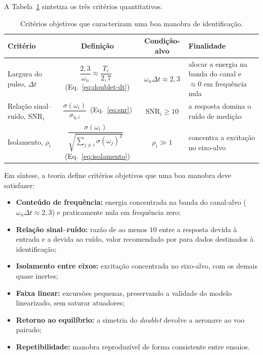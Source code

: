 A Tabela~\ref{tab:criterios} sintetiza os três critérios quantitativos.

\begin{table}[ht]
\centering
\caption{Critérios objetivos que caracterizam uma boa manobra de identificação.}
\label{tab:criterios}
\small
\begin{tabular}{@{}l c c p{3.7cm}@{}}
\toprule
Critério & Definição & Condição-alvo & Finalidade \\
\midrule
Largura do pulso, $\Delta t$ & $\dfrac{2{,}3}{\omega_n} \approx \dfrac{T_c}{2{,}7}$ \,(Eq.~\ref{eq:doublet-dt}) & $\omega_n\Delta t \approx 2{,}3$ & alocar a energia na banda do canal e $\approx 0$ em frequência nula \\[6pt]
Relação sinal--ruído, $\mathrm{SNR}_i$ & $\dfrac{\sigma(\omega_i)}{\sigma_{\eta,i}}$ \,(Eq.~\ref{eq:snr}) & {\color{blue}$\mathrm{SNR}_i \geq 10$} & a resposta domina o ruído de medição \\[6pt]
Isolamento, $\rho_i$ & $\dfrac{\sigma(\omega_i)}{\sqrt{\sum_{j\neq i}\sigma(\omega_j)^2}}$ \,(Eq.~\ref{eq:isolamento}) & $\rho_i \gg 1$ & concentra a excitação no eixo-alvo \\
\bottomrule
\end{tabular}
\end{table}

Em síntese, a teoria define critérios objetivos que uma boa manobra deve satisfazer:
\begin{itemize}
    \item \textbf{Conteúdo de frequência:} energia concentrada na banda do canal-alvo ($\omega_n \Delta t \approx 2{,}3$) e praticamente nula em frequência zero;
    \item \textbf{Relação sinal--ruído:} {\color{blue}razão de ao menos $10$ entre a resposta devida à entrada e a devida ao ruído, valor recomendado por \textcite{Jategaonkar2015} para dados destinados à identificação};
    \item \textbf{Isolamento entre eixos:} excitação concentrada no eixo-alvo, com os demais quase inertes;
    \item \textbf{Faixa linear:} excursões pequenas, preservando a validade do modelo linearizado, sem saturar atuadores;
    \item \textbf{Retorno ao equilíbrio:} a simetria do \textit{doublet} devolve a aeronave ao voo pairado;
    \item \textbf{Repetibilidade:} manobra reproduzível de forma consistente entre ensaios.
\end{itemize}

